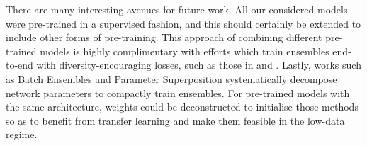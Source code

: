 \documentclass{article} \usepackage{iclr2021_conference,times}
\begin{document}
There are many interesting avenues for future work. All our considered models were pre-trained in a supervised fashion, and this should certainly be extended to include other forms of pre-training. This approach of combining different pre-trained models is highly complimentary with efforts which train ensembles end-to-end with diversity-encouraging losses, such as those in \citet{Lee2015WhyMH} and \citet{webb2019ensemble}. Lastly, works such as Batch Ensembles \citep{wen2020batchensemble} and Parameter Superposition \citep{cheung2019superposition} systematically decompose network parameters to compactly train ensembles. For pre-trained models with the same architecture, weights could be deconstructed to initialise those methods so as to benefit from transfer learning and make them feasible in the low-data regime.
 
\end{document}
